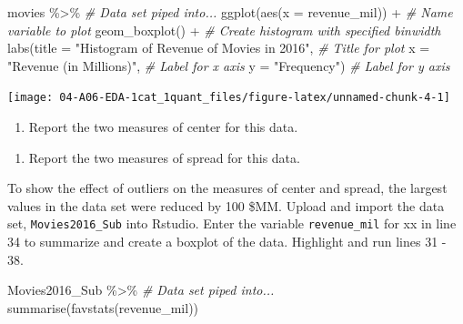 \documentclass[
]{report}
\newenvironment{Shaded}{\begin{snugshade}}{\end{snugshade}}
\newcommand{\AttributeTok}[1]{\textcolor[rgb]{0.77,0.63,0.00}{#1}}
\newcommand{\CommentTok}[1]{\textcolor[rgb]{0.56,0.35,0.01}{\textit{#1}}}
\newcommand{\FunctionTok}[1]{\textcolor[rgb]{0.00,0.00,0.00}{#1}}
\newcommand{\NormalTok}[1]{#1}
\newcommand{\SpecialCharTok}[1]{\textcolor[rgb]{0.00,0.00,0.00}{#1}}
\newcommand{\StringTok}[1]{\textcolor[rgb]{0.31,0.60,0.02}{#1}}
\providecommand{\tightlist}{%
  \setlength{\itemsep}{0pt}\setlength{\parskip}{0pt}}
\begin{document}
\begin{Shaded}
\begin{Highlighting}[]
\NormalTok{movies }\SpecialCharTok{\%\textgreater{}\%} \CommentTok{\# Data set piped into...}
\FunctionTok{ggplot}\NormalTok{(}\FunctionTok{aes}\NormalTok{(}\AttributeTok{x =}\NormalTok{ revenue\_mil)) }\SpecialCharTok{+}   \CommentTok{\# Name variable to plot}
  \FunctionTok{geom\_boxplot}\NormalTok{() }\SpecialCharTok{+}  \CommentTok{\# Create histogram with specified binwidth}
  \FunctionTok{labs}\NormalTok{(}\AttributeTok{title =} \StringTok{"Histogram of Revenue of Movies in 2016"}\NormalTok{, }\CommentTok{\# Title for plot}
       \AttributeTok{x =} \StringTok{"Revenue (in Millions)"}\NormalTok{, }\CommentTok{\# Label for x axis}
       \AttributeTok{y =} \StringTok{"Frequency"}\NormalTok{) }\CommentTok{\# Label for y axis}
\end{Highlighting}
\end{Shaded}

\begin{center}\texttt{[image: 04-A06-EDA-1cat\_1quant\_files/figure-latex/unnamed-chunk-4-1]} \end{center}

\begin{enumerate}
\def\labelenumi{\arabic{enumi}.}
\setcounter{enumi}{7}
\tightlist
\item
  Report the two measures of center for this data.
\end{enumerate}

\vspace{0.8in}

\begin{enumerate}
\def\labelenumi{\arabic{enumi}.}
\setcounter{enumi}{8}
\tightlist
\item
  Report the two measures of spread for this data.
\end{enumerate}

\vspace{0.8in}

To show the effect of outliers on the measures of center and spread, the largest values in the data set were reduced by 100 \$MM. Upload and import the data set, \texttt{Movies2016\_Sub} into Rstudio. Enter the variable \texttt{revenue\_mil} for xx in line 34 to summarize and create a boxplot of the data. Highlight and run lines 31 - 38.

\begin{Shaded}
\begin{Highlighting}[]
\NormalTok{Movies2016\_Sub }\SpecialCharTok{\%\textgreater{}\%} \CommentTok{\# Data set piped into...}
  \FunctionTok{summarise}\NormalTok{(}\FunctionTok{favstats}\NormalTok{(revenue\_mil))}
\end{Highlighting}
\end{Shaded}
\end{document}
